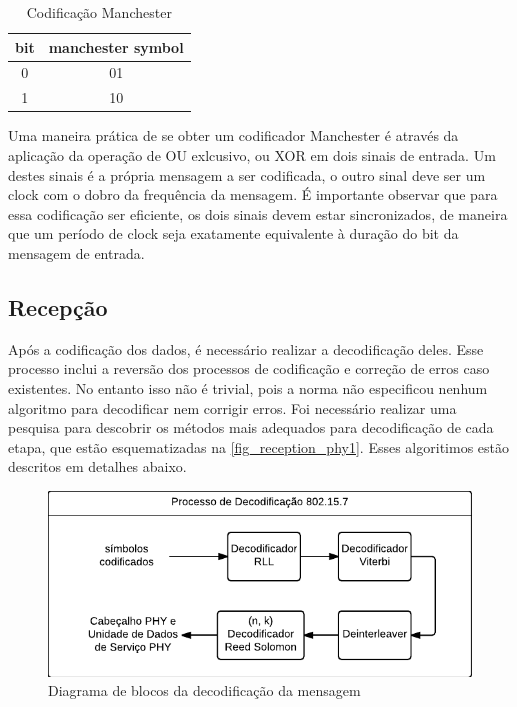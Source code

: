 	\begin{table}[ht]
		\caption{Codificação Manchester}
		\centering
		\begin{tabular}{c c}
			\hline
			bit & manchester symbol \\ \hline
			0 & 01 \\
			1 & 10 \\ \hline
		\end{tabular}
		\label{tabela_cod_manchester}
	\end{table}
	
	Uma maneira prática de se obter um codificador Manchester é através da aplicação da operação de OU exlcusivo, ou XOR em dois sinais de entrada. Um destes sinais é a própria mensagem a ser codificada, o outro sinal deve ser um clock com o dobro da frequência da mensagem. É importante observar que para essa codificação ser eficiente, os dois sinais devem estar sincronizados, de maneira que um período de clock seja exatamente equivalente à duração do bit da mensagem de entrada.	
	
	\subsection{Recepção}\label{section_norma_recepcao}
	
	Após a codificação dos dados, é necessário realizar a decodificação deles. Esse processo inclui a reversão dos processos de codificação e correção de erros caso existentes. No entanto isso não é trivial, pois a norma não especificou nenhum algoritmo para decodificar nem corrigir erros. Foi necessário realizar uma pesquisa para descobrir os métodos mais adequados para decodificação de cada etapa, que estão esquematizadas na \autoref{fig_reception_phy1}. Esses algoritimos estão descritos em detalhes abaixo.

	\begin{figure}[!htb]
		\caption{\label{fig_reception_phy1} Diagrama de blocos da decodificação da mensagem}
		\centering
		\includegraphics[width=0.4\textheight]{PHY1-reception.pdf}
	\end{figure}
	
